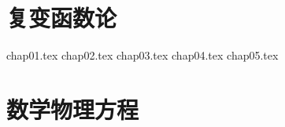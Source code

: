 \documentclass[
]{ctexbook}
\begin{document}


\setcounter{secnumdepth}{4}
\setcounter{tocdepth}{4}
\tableofcontents
% 


% 
% 

% 
% 
% 
\part{复变函数论}

{chap01.tex}
{chap02.tex}
{chap03.tex}
{chap04.tex}
{chap05.tex}

\part{数学物理方程}
\end{document}

